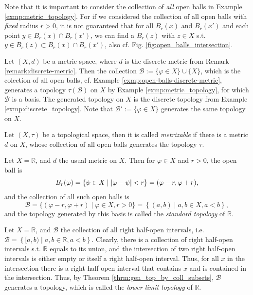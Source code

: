 \begin{remark}
	Note that it is important to consider the collection of \textit{all} open balls in Example \ref{exmp:metric_topology}. For if we considered the collection of all open balls with \textit{fixed} radius $r > 0$, it is not guaranteed that for all $B_{r}(x)$ and $B_{r}(x')$ and each point $y\in B_{r}(x)\cap B_{r}(x')$, we can find a $B_{r}(z)$ with $z\in X$ s.t. $y\in B_{r}(z)\subset B_{r}(x)\cap B_{r}(x')$, also cf. Fig. \ref{fig:open_balls_intersection}.
\end{remark}

\begin{exmp}\label{exmp:basis_discrete_metric}
	Let $(X, d)$ be a metric space, where $d$ is the discrete metric from Remark \ref{remark:discrete-metric}. Then the collection $\mathscr B := \{\varphi\in X\}\cup \{X\}$, which is the colection of all open balls, cf. Example \ref{exmp:open-balls-discrete-metric}, generates a topology $\tau(\mathscr B)$ on $X$ by Example \ref{exmp:metric_topology}, for which $\mathscr B$ is a basis. The generated topology on $X$ is the discrete topology from Example \ref{exmp:discrete_topology}. Note that $\mathscr B' := \{\varphi\in X\}$ generates the same topology on $X$.
\end{exmp}

\begin{defn}
	Let $(X, \tau)$ be a topological space, then it is called \textit{metrizable} if there is a metric $d$ on $X$, whose collection of all open balls generates the topology $\tau$.
\end{defn}

\begin{defn}\label{defn:standard_topology}
	Let $X = \mathbb R$, and $d$ the usual metric on $X$. Then for $\varphi\in X$ and $r > 0$, the open ball is $$B_{r}(\varphi) = \{ \psi\in X\mid \left\vert \varphi - \psi \right\vert < r \} = (\varphi - r, \varphi + r),$$ and the collection of all such open balls is $$\mathscr B = \{(\varphi - r, \varphi + r) \mid \varphi\in X, r > 0\} = \left\{(a, b) \mid a, b\in X, a < b\right\},$$
	and the topology generated by this basis is called the \textit{standard topology} of $\mathbb R$.
\end{defn}

\begin{defn}
	Let $X = \mathbb R$, and $\mathscr B$ the collection of all right half-open intervals, i.e. $\mathscr B= \left\{ [a, b) \mid a, b\in\mathbb R, a < b \right\}$. Clearly, there is a collection of right half-open intervals s.t. $\mathbb R$ equals to its union, and the intersection of two right half-open intervals is either empty or itself a right half-open interval. Thus, for all $x$ in the intersection there is a right half-open interval that contains $x$ and is contained in the intersection. Thus, by Theorem \ref{thrm:gen_top_by_coll_subsets}, $\mathscr B$ generates a topology, which is called the \textit{lower limit topology} of $\mathbb R$.
\end{defn}

